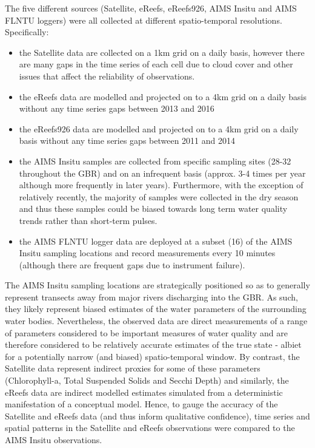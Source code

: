 The five different sources (Satellite, eReefs, eReefs926, AIMS Insitu and AIMS FLNTU loggers) were
all collected at different spatio-temporal resolutions.  Specifically:
\begin{itemize}
\item the Satellite data are collected on a 1km grid on a daily basis, however there are many gaps
in the time series of each cell due to cloud cover and other issues that affect the reliability of
observations.
\item the eReefs data are modelled and projected on to a 4km grid on a daily basis without any time series gaps
between 2013 and 2016
\item the eReefs926 data are modelled and projected  on to a 4km grid on a daily basis without any time series gaps
between 2011 and 2014
\item the AIMS Insitu samples are collected from specific sampling sites (28-32 throughout the GBR)
and on an infrequent basis (approx. 3-4 times per year although more frequently in later years).
Furthermore, with the exception of relatively recently, the majority of samples were collected in
the dry season and thus these samples could be biased towards long term water quality trends rather
than short-term pulses.
\item the AIMS FLNTU logger data are deployed at a subset (16) of the AIMS Insitu sampling locations
and record measurements every 10 minutes (although there are frequent gaps due to instrument
failure).
\end{itemize}

The AIMS Insitu sampling locations are strategically positioned so as to generally represent
transects away from major rivers discharging into the GBR.  As such, they likely represent biased
estimates of the water parameters of the surrounding water bodies.  Nevertheless, the observed data
are direct measurements of a range of parameters considered to be important measures of water
quality and are therefore considered to be relatively accurate estimates of the true state - albiet
for a potentially narrow (and biased) spatio-temporal window.  By contrast, the Satellite data represent indirect
proxies for some of these parameters (Chlorophyll-a, Total Suspended Solids and Secchi Depth) and
similarly, the eReefs data are indirect modelled estimates simulated from a deterministic
manifestation of a conceptual model.  Hence, to gauge the accuracy of the Satellite and eReefs data
(and thus inform qualitative confidence), time series and spatial patterns in the Satellite and
eReefs observations were compared to the AIMS Insitu observations.
 
